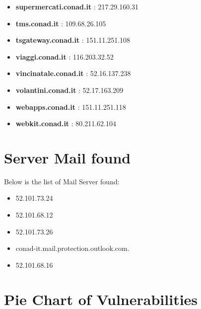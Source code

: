 \documentclass{article}
\begin{document}
\begin{itemize}
            \item \textbf{ supermercati.conad.it }: 217.29.160.31
        
            \item \textbf{ tms.conad.it }: 109.68.26.105
        
            \item \textbf{ tsgateway.conad.it }: 151.11.251.108
        
            \item \textbf{ viaggi.conad.it }: 116.203.32.52
        
            \item \textbf{ vincinatale.conad.it }: 52.16.137.238
        
            \item \textbf{ volantini.conad.it }: 52.17.163.209
        
            \item \textbf{ webapps.conad.it }: 151.11.251.118
        
            \item \textbf{ webkit.conad.it }: 80.211.62.104
        
    
\end{itemize}

\clearpage

\section{Server Mail found}

Below is the list of Mail Server found:

\begin{itemize}
    
        
            \item 52.101.73.24
        
            \item 52.101.68.12
        
            \item 52.101.73.26
        
            \item conad-it.mail.protection.outlook.com.
        
            \item 52.101.68.16
        
    
\end{itemize}

\clearpage

\section{Pie Chart of Vulnerabilities}
\end{document}
